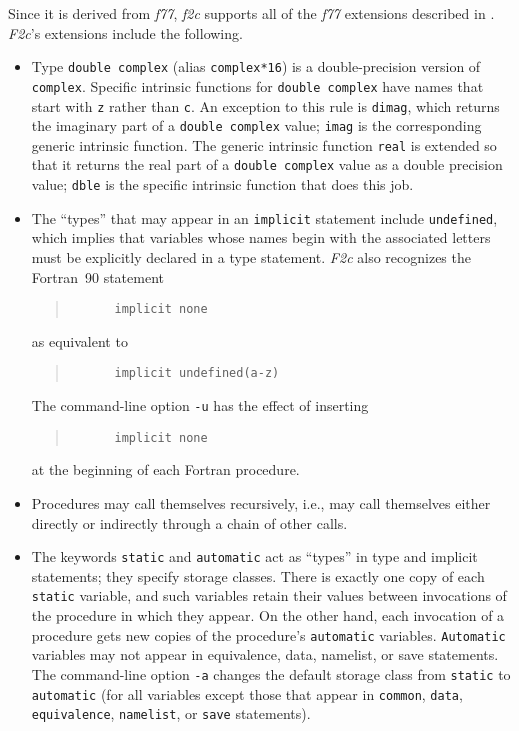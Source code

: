 \documentclass[10pt,a4paper]{article}
\begin{document}
Since it is derived from \emph{f77}, \emph{f2c} supports all of the \emph{f77} extensions described in \citep{6}. \emph{F2c}’s extensions include the following.
\begin{itemize}
\item Type \verb|double complex| (alias \verb|complex*16|) is a double-precision version of \verb|complex|. Specific intrinsic functions for \verb|double complex| have names that start with \verb|z| rather than \verb|c|. An exception to this rule is \verb|dimag|, which returns the imaginary part of a \verb|double complex| value; \verb|imag| is the corresponding generic intrinsic function. The generic intrinsic function \verb|real| is extended so that it returns the real part of a \verb|double complex| value as a double precision value; \verb|dble| is the specific intrinsic function that does this job.

\item The ``types'' that may appear in an \verb|implicit| statement include \verb|undefined|, which implies that variables whose names begin with the associated letters must be explicitly declared in a type statement. \emph{F2c} also recognizes the Fortran~90 statement
\begin{quote}
\begin{verbatim}
      implicit none
\end{verbatim}
\end{quote}
as equivalent to
\begin{quote}
\begin{verbatim}
      implicit undefined(a-z)
\end{verbatim}
\end{quote}
The command-line option \verb|-u| has the effect of inserting
\begin{quote}
\begin{verbatim}
      implicit none
\end{verbatim}
\end{quote}
at the beginning of each Fortran procedure.

\item Procedures may call themselves recursively, i.e., may call themselves either directly or indirectly through a chain of other calls.

\item The keywords \verb|static| and \verb|automatic| act as ``types'' in type and implicit statements; they specify storage classes. There is exactly one copy of each \verb|static| variable, and such variables retain their values between invocations of the procedure in which they appear. On the other hand, each invocation of a procedure gets new copies of the procedure’s \verb|automatic| variables. \verb|Automatic| variables may not appear in equivalence, data, namelist, or save statements. The command-line option \verb|-a| changes the default storage class from \verb|static| to \verb|automatic| (for all variables except those that appear in \verb|common|, \verb|data|, \verb|equivalence|, \verb|namelist|, or \verb|save| statements).


\end{itemize}
\end{document}
